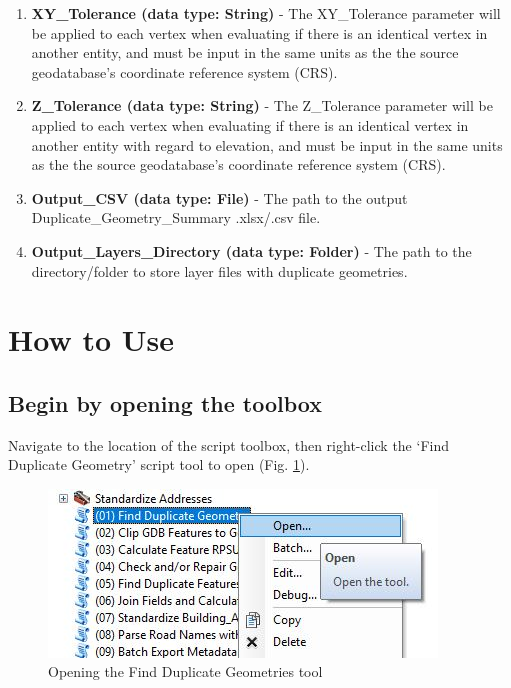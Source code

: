 \documentclass[openany]{book}
\theoremstyle{definition}
\theoremstyle{definition}
\theoremstyle{definition}
\theoremstyle{remark}
\begin{document}
\begin{enumerate}
\def\labelenumi{\arabic{enumi}.}
\setcounter{enumi}{1}
\item
  \textbf{XY\_Tolerance (data type: String)} - The XY\_Tolerance
  parameter will be applied to each vertex when evaluating if there is
  an identical vertex in another entity, and must be input in the same
  units as the the source geodatabase's coordinate reference system
  (CRS).
\item
  \textbf{Z\_Tolerance (data type: String)} - The Z\_Tolerance parameter
  will be applied to each vertex when evaluating if there is an
  identical vertex in another entity with regard to elevation, and must
  be input in the same units as the the source geodatabase's coordinate
  reference system (CRS).
\item
  \textbf{Output\_CSV (data type: File)} - The path to the output
  Duplicate\_Geometry\_Summary .xlsx/.csv file.
\item
  \textbf{Output\_Layers\_Directory (data type: Folder)} - The path to
  the directory/folder to store layer files with duplicate geometries.
\end{enumerate}

\section{How to Use}\label{how-to-use-2}

\subsection{Begin by opening the
toolbox}\label{begin-by-opening-the-toolbox-2}

Navigate to the location of the script toolbox, then right-click the
`Find Duplicate Geometry' script tool to open (Fig. \ref{fig:dupGopen}).

\begin{figure}[H]

{\centering \includegraphics{figures/dupG-opentool} 

}

\caption{Opening the Find Duplicate Geometries tool}\label{fig:dupGopen}
\end{figure}
\end{document}
